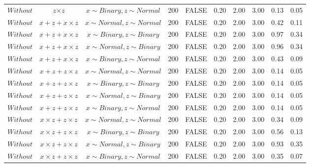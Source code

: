 \begin{longtable}{lccccccccc}
  $Without$ & $\textit{z} \times \textit{z}$ & $\textit{x} \sim Binary, \textit{z} \sim Normal$ & 200 & FALSE & 0.20 & 2.00 & 3.00 & 0.13 & 0.05 \\ 
  $Without$ & $\textit{x} + \textit{z} + \textit{x} \times \textit{z}$ & $\textit{x} \sim Normal , \textit{z} \sim Normal$ & 200 & FALSE & 0.20 & 2.00 & 3.00 & 0.42 & 0.11 \\ 
  $Without$ & $\textit{x} + \textit{z} + \textit{x} \times \textit{z}$ & $\textit{x} \sim Binary, \textit{z} \sim Binary$ & 200 & FALSE & 0.20 & 2.00 & 3.00 & 0.97 & 0.34 \\ 
  $Without$ & $\textit{x} + \textit{z} + \textit{x} \times \textit{z}$ & $\textit{x} \sim Normal, \textit{z} \sim Binary$ & 200 & FALSE & 0.20 & 2.00 & 3.00 & 0.96 & 0.34 \\ 
  $Without$ & $\textit{x} + \textit{z} + \textit{x} \times \textit{z}$ & $\textit{x} \sim Binary, \textit{z} \sim Normal$ & 200 & FALSE & 0.20 & 2.00 & 3.00 & 0.43 & 0.09 \\ 
  $Without$ & $\textit{x} + \textit{z} + \textit{z} \times \textit{z}$ & $\textit{x} \sim Normal , \textit{z} \sim Normal$ & 200 & FALSE & 0.20 & 2.00 & 3.00 & 0.14 & 0.05 \\ 
  $Without$ & $\textit{x} + \textit{z} + \textit{z} \times \textit{z}$ & $\textit{x} \sim Binary, \textit{z} \sim Binary$ & 200 & FALSE & 0.20 & 2.00 & 3.00 & 0.14 & 0.05 \\ 
  $Without$ & $\textit{x} + \textit{z} + \textit{z} \times \textit{z}$ & $\textit{x} \sim Normal, \textit{z} \sim Binary$ & 200 & FALSE & 0.20 & 2.00 & 3.00 & 0.14 & 0.05 \\ 
  $Without$ & $\textit{x} + \textit{z} + \textit{z} \times \textit{z}$ & $\textit{x} \sim Binary, \textit{z} \sim Normal$ & 200 & FALSE & 0.20 & 2.00 & 3.00 & 0.14 & 0.05 \\ 
  $Without$ & $\textit{x} \times \textit{z} + \textit{z} \times \textit{z}$ & $\textit{x} \sim Normal , \textit{z} \sim Normal$ & 200 & FALSE & 0.20 & 2.00 & 3.00 & 0.34 & 0.09 \\ 
  $Without$ & $\textit{x} \times \textit{z} + \textit{z} \times \textit{z}$ & $\textit{x} \sim Binary, \textit{z} \sim Binary$ & 200 & FALSE & 0.20 & 2.00 & 3.00 & 0.56 & 0.13 \\ 
  $Without$ & $\textit{x} \times \textit{z} + \textit{z} \times \textit{z}$ & $\textit{x} \sim Normal, \textit{z} \sim Binary$ & 200 & FALSE & 0.20 & 2.00 & 3.00 & 0.93 & 0.35 \\ 
  $Without$ & $\textit{x} \times \textit{z} + \textit{z} \times \textit{z}$ & $\textit{x} \sim Binary, \textit{z} \sim Normal$ & 200 & FALSE & 0.20 & 2.00 & 3.00 & 0.35 & 0.07 \\ 

\end{longtable}
